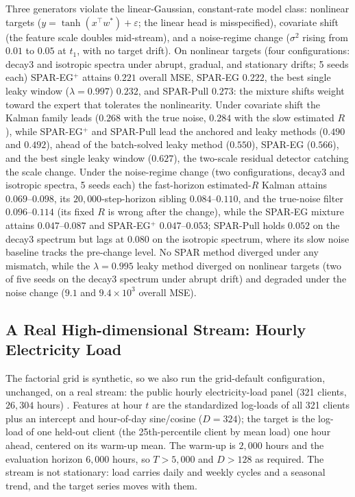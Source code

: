 \documentclass[11pt]{article}
\begin{document}
Three generators violate the linear-Gaussian, constant-rate model class: nonlinear targets ($y = \tanh(x^\top w^*) + \varepsilon$; the linear head is misspecified), covariate shift (the feature scale doubles mid-stream), and a noise-regime change ($\sigma^2$ rising from $0.01$ to $0.05$ at $t_1$, with no target drift).
On nonlinear targets (four configurations: decay3 and isotropic spectra under abrupt, gradual, and stationary drifts; 5 seeds each) SPAR-EG$^+$ attains $0.221$ overall MSE, SPAR-EG $0.222$, the best single leaky window ($\lambda = 0.997$) $0.232$, and SPAR-Pull $0.273$: the mixture shifts weight toward the expert that tolerates the nonlinearity.
Under covariate shift the Kalman family leads ($0.268$ with the true noise, $0.284$ with the slow estimated $R$), while SPAR-EG$^+$ and SPAR-Pull lead the anchored and leaky methods ($0.490$ and $0.492$), ahead of the batch-solved leaky method ($0.550$), SPAR-EG ($0.566$), and the best single leaky window ($0.627$), the two-scale residual detector catching the scale change.
Under the noise-regime change (two configurations, decay3 and isotropic spectra, 5 seeds each) the fast-horizon estimated-$R$ Kalman attains $0.069$--$0.098$, its $20{,}000$-step-horizon sibling $0.084$--$0.110$, and the true-noise filter $0.096$--$0.114$ (its fixed $R$ is wrong after the change), while the SPAR-EG mixture attains $0.047$--$0.087$ and SPAR-EG$^+$ $0.047$--$0.053$; SPAR-Pull holds $0.052$ on the decay3 spectrum but lags at $0.080$ on the isotropic spectrum, where its slow noise baseline tracks the pre-change level.
No SPAR method diverged under any mismatch, while the $\lambda = 0.995$ leaky method diverged on nonlinear targets (two of five seeds on the decay3 spectrum under abrupt drift) and degraded under the noise change ($9.1$ and $9.4\times 10^3$ overall MSE).

\subsection{A Real High-dimensional Stream: Hourly Electricity Load}
\label{app:realstream}

The factorial grid is synthetic, so we also run the grid-default configuration, unchanged, on a real stream: the public hourly electricity-load panel (321 clients, $26{,}304$ hours) \citep{trindade2015electricity,lai2018lstd}.
Features at hour $t$ are the standardized log-loads of all 321 clients plus an intercept and hour-of-day sine/cosine ($D = 324$); the target is the log-load of one held-out client (the 25th-percentile client by mean load) one hour ahead, centered on its warm-up mean.
The warm-up is $2{,}000$ hours and the evaluation horizon $6{,}000$ hours, so $T > 5{,}000$ and $D > 128$ as required.
The stream is not stationary: load carries daily and weekly cycles and a seasonal trend, and the target series moves with them.
\end{document}
